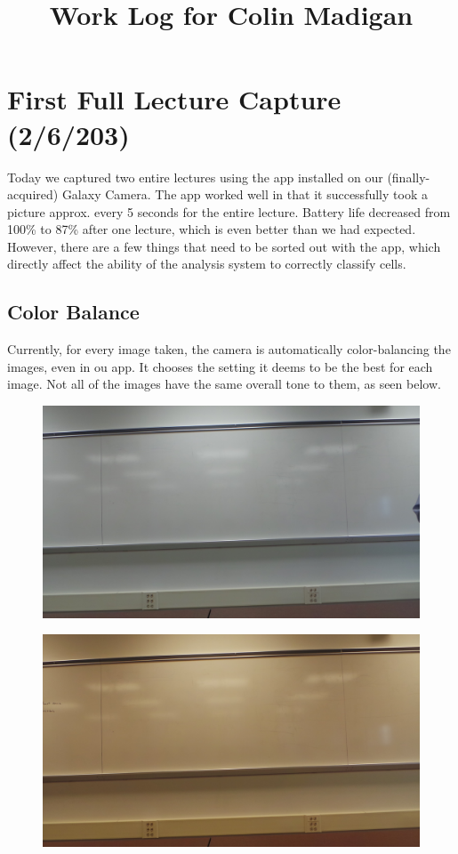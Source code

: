 \documentclass[]{article}
\begin{document}
\title{Work Log for Colin Madigan}
\date{}
\maketitle
	\tableofcontents
\newpage

	\section{First Full Lecture Capture (2/6/203)}
		Today we captured two entire lectures using the app installed on our (finally-acquired) Galaxy Camera.  The app worked well in that it successfully took a picture approx. every 5 seconds for the entire lecture.  Battery life decreased from 100\% to 87\% after one lecture, which is even better than we had expected.  However, there are a few things that need to be sorted out with the app, which directly affect the ability of the analysis system to correctly classify cells.  
		\subsection*{Color Balance}
		Currently, for every image taken, the camera is automatically color-balancing the images, even in ou app.  It chooses the setting it deems to be the best for each image.  Not all of the images have the same overall tone  to them, as seen below.  
	\begin{figure}[H]
\centering
\includegraphics[scale=0.1]{images/colorbalance_1}

\end{figure}
		
\begin{figure}[H]
\centering
\includegraphics[scale=0.1]{images/colorbalance_2}

\end{figure}	
		
\end{document}
